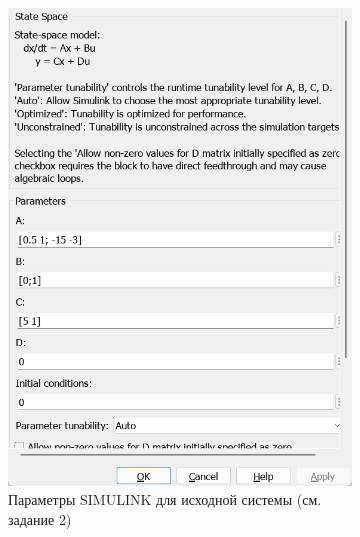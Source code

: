 \documentclass[a4paper, 12pt]{article}
\begin{document}
    \begin{figure}[H]
        \centering
        \begin{subfigure}{0.3\textwidth}
            \centering
            \includegraphics[width=\linewidth]{model_3_window.png}
            \caption{Параметры SIMULINK для исходной системы (см. задание 2)}
            \label{fig:m3w}
        \end{subfigure}
        \begin{subfigure}{0.3\textwidth}
            \centering

\end{subfigure}
\end{figure}
\end{document}
